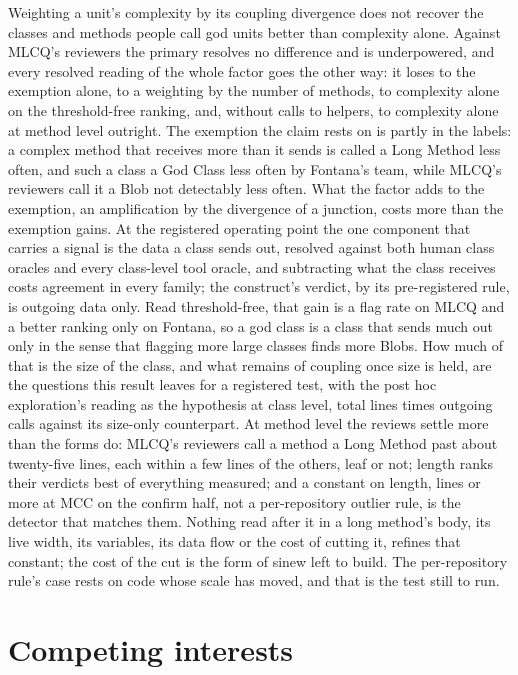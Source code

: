 \documentclass[11pt,a4paper]{article}
\begin{document}
Weighting a unit's complexity by its coupling divergence does not recover
the classes and methods people call god units better than complexity
alone. Against MLCQ's reviewers the primary resolves no difference and is
underpowered, and every resolved reading of the whole factor goes the other
way: it loses to the exemption alone, to a weighting by the number of
methods, to complexity alone on the threshold-free ranking, and, without
calls to helpers, to complexity alone at method level outright. The
exemption the claim rests on is partly in the labels: a complex method that
receives more than it sends is called a Long Method less often, and such a
class a God Class less often by Fontana's team, while MLCQ's reviewers call
it a Blob not detectably less often. What the factor adds to the exemption,
an amplification by the divergence of a junction, costs more than the
exemption gains. At the registered operating point the one component that carries a signal
is the data a class sends out, resolved against both human class oracles
and every class-level tool oracle, and subtracting what the class receives
costs agreement in every family; the construct's verdict, by its
pre-registered rule, is outgoing data only. Read threshold-free, that gain
is a flag rate on MLCQ and a better ranking only on Fontana, so a god class
is a class that sends much out only in the sense that flagging more large
classes finds more Blobs.
How much of that is the size of the class, and what remains of coupling
once size is held, are the questions this result leaves for a registered
test, with the post hoc exploration's reading as the hypothesis at class level,
total lines times outgoing calls against its size-only counterpart. At
method level the reviews settle more than the forms do: MLCQ's reviewers
call a method a Long Method past about twenty-five lines, each within a few
lines of the others, leaf or not; length ranks their verdicts best of
everything measured; and a constant on length, \lwLengthCutoff{} lines or
more at MCC \lwLengthMccConfirm{} on the confirm half, not a
per-repository outlier rule, is the detector that matches them. Nothing
read after it in a long method's body, its live width, its variables, its
data flow or the cost of cutting it, refines that constant; the cost of the
cut is the form of sinew left to build. The per-repository rule's
case rests on code whose scale has moved, and that is the test still to
run.

\section*{Competing interests}
\end{document}
